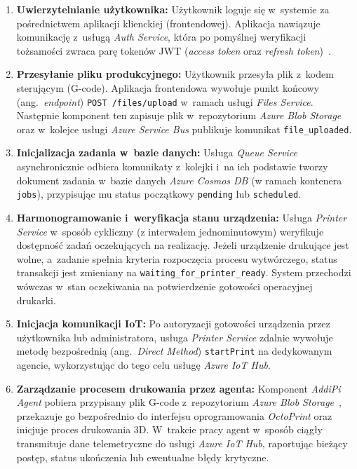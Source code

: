 \documentclass[a4paper,12pt,reqno]{article}
\begin{document}
\begin{enumerate}
	\item \textbf{Uwierzytelnianie użytkownika:} Użytkownik loguje się w~systemie za pośrednictwem aplikacji klienckiej (frontendowej). Aplikacja nawiązuje komunikację z~usługą \textit{Auth Service}, która po pomyślnej weryfikacji tożsamości zwraca parę tokenów JWT (\textit{access token} oraz \textit{refresh token})~\cite{jwt}.
	
	\item \textbf{Przesyłanie pliku produkcyjnego:} Użytkownik przesyła plik z~kodem sterującym (G-code). Aplikacja frontendowa wywołuje punkt końcowy (ang.~\textit{endpoint}) \texttt{POST /files/upload} w~ramach usługi \textit{Files Service}. Następnie komponent ten zapisuje plik w~repozytorium \textit{Azure Blob Storage}~\cite{blobstorage} oraz w~kolejce usługi \textit{Azure Service Bus} publikuje komunikat \texttt{file\_uploaded}.
	
	\item \textbf{Inicjalizacja zadania w~bazie danych:} Usługa \textit{Queue Service} asynchronicznie odbiera komunikaty z~kolejki i~na ich podstawie tworzy dokument zadania w~bazie danych \textit{Azure Cosmos DB} (w ramach kontenera \texttt{jobs}), przypisując mu status początkowy \texttt{pending} lub \texttt{scheduled}.
	
	\item \textbf{Harmonogramowanie i~weryfikacja stanu urządzenia:} Usługa \textit{Printer Service} w~sposób cykliczny (z interwałem jednominutowym) weryfikuje dostępność zadań oczekujących na realizację. Jeżeli urządzenie drukujące jest wolne, a~zadanie spełnia kryteria rozpoczęcia procesu wytwórczego, status transakcji jest zmieniany na \texttt{waiting\_for\_printer\_ready}. System przechodzi wówczas w~stan oczekiwania na potwierdzenie gotowości operacyjnej drukarki.
	
	\item \textbf{Inicjacja komunikacji IoT:} Po autoryzacji gotowości urządzenia przez użytkownika lub administratora, usługa \textit{Printer Service} zdalnie wywołuje metodę bezpośrednią (ang.~\textit{Direct Method}) \texttt{startPrint} na dedykowanym agencie, wykorzystując do tego celu usługę \textit{Azure IoT Hub}.
	
	\item \textbf{Zarządzanie procesem drukowania przez agenta:} Komponent \textit{AddiPi Agent} pobiera przypisany plik G-code z~repozytorium \textit{Azure Blob Storage}~\cite{blobstorage}, przekazuje go bezpośrednio do interfejsu oprogramowania \textit{OctoPrint} oraz inicjuje proces drukowania 3D. W~trakcie pracy agent w~sposób ciągły transmituje dane telemetryczne do usługi \textit{Azure IoT Hub}, raportując bieżący postęp, status ukończenia lub ewentualne błędy krytyczne.
	

\end{enumerate}
\end{document}
